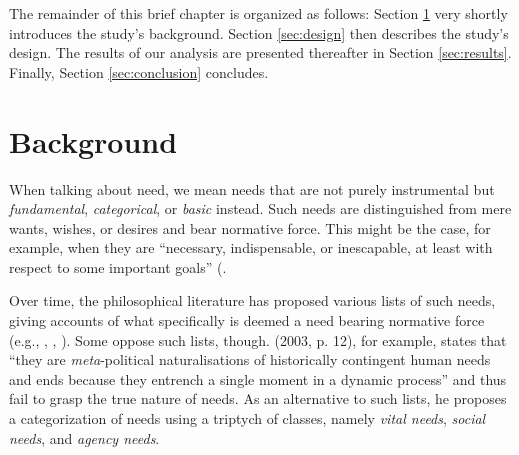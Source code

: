 \documentclass[egregdoesnotlikesansseriftitles]{scrartcl}
\begin{document}
The remainder of this brief chapter is organized as follows:
Section \ref{sec:literature} very shortly introduces the study's background.
Section \ref{sec:design} then describes the study's design.
The results of our analysis are presented thereafter in Section \ref{sec:results}.
Finally, Section \ref{sec:conclusion} concludes.


\section{Background}\label{sec:literature}
When talking about need, we mean needs that are not purely instrumental but \textit{fundamental}, \textit{categorical}, or \textit{basic} instead.
Such needs are distinguished from mere wants, wishes, or desires and bear normative force.
This might be the case, for example, when they are ``necessary, indispensable, or inescapable, at least with respect to some important goals'' (\citealt[par. 37)]{brock_needs_2019}.

Over time, the philosophical literature has proposed various lists of such needs, giving accounts of what specifically is deemed a need bearing normative force (e.g., \citealt{doyal_theory_1991}, \citealt{braybrooke_meeting_1987}, \citealt{nussbaum_aristotelian_1990}).
Some oppose such lists, though.
\citeauthor{hamilton_political_2003} (2003, p. 12), for example, states that ``they are \textit{meta}-political naturalisations of historically contingent human needs and ends because they entrench a single moment in a dynamic process'' and thus fail to grasp the true nature of needs.
As an alternative to such lists, he proposes a categorization of needs using a triptych of classes, namely \textit{vital needs}, \textit{social needs}, and \textit{agency needs}.
\end{document}
